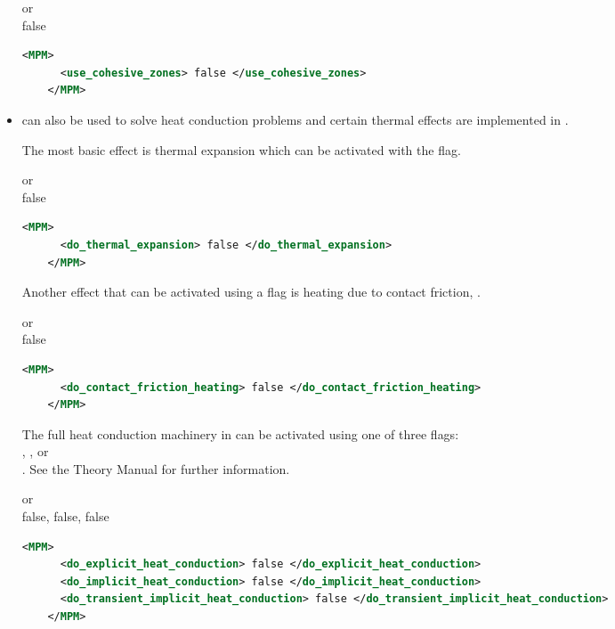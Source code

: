 \begin{itemize}
      or \\
     false
    \begin{lstlisting}[language=XML]
    <MPM>
      <use_cohesive_zones> false </use_cohesive_zones>
    </MPM>
    \end{lstlisting}

  \item {} \MPM can also be used to solve
    heat conduction problems and certain thermal effects are implemented 
    in \Vaango. 

    The most basic effect is thermal expansion which can be activated with
    the  flag.

      or \\
     false
    \begin{lstlisting}[language=XML]
    <MPM>
      <do_thermal_expansion> false </do_thermal_expansion>
    </MPM>
    \end{lstlisting}

    Another effect that can be activated using a flag is heating due to
    contact friction, \newline {}.

      or \\
     false
    \begin{lstlisting}[language=XML]
    <MPM>
      <do_contact_friction_heating> false </do_contact_friction_heating>
    </MPM>
    \end{lstlisting}

    The full heat conduction machinery in \Vaango can be activated using
    one of three flags: \\,
    , or \\
    .  See the \Vaango
    Theory Manual for further information.

      or \\
     false, false, false
    \begin{lstlisting}[language=XML]
    <MPM>
      <do_explicit_heat_conduction> false </do_explicit_heat_conduction>
      <do_implicit_heat_conduction> false </do_implicit_heat_conduction>
      <do_transient_implicit_heat_conduction> false </do_transient_implicit_heat_conduction>
    </MPM>
    \end{lstlisting}


\end{itemize}
